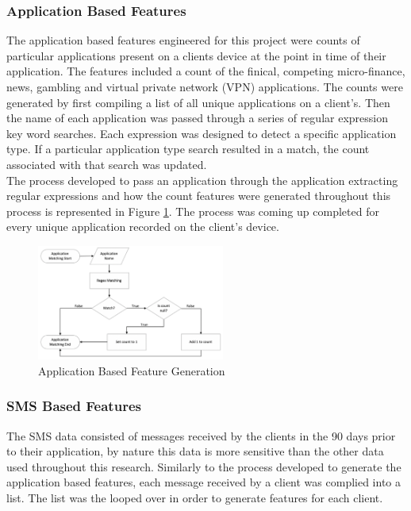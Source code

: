 \subsubsection{Application Based Features}

The application based features engineered for this project were counts of particular applications present on a clients device at the point in time of their application. The features included a count of the finical, competing micro-finance, news, gambling and virtual private network (VPN) applications. The counts were generated by first compiling a list of all unique applications on a client's. Then the name of each application was passed through a series of regular expression key word searches. Each expression was designed to detect a specific application type. If  a particular application type search resulted in a match, the count associated with that search was updated. \\

The process developed to pass an application through the application extracting regular expressions and how the count features were generated throughout this process is represented in Figure \ref{fig:app_features}. The process was coming up completed for every unique application recorded on the client's device. 


\vspace{10 pt}

\begin{figure}[!htb]
\centering
\includegraphics[width=0.55\textwidth]{images/app_feats.png}
\caption{Application Based Feature Generation}
\label{fig:app_features}
\end{figure}


\subsubsection{SMS Based Features}

The SMS data consisted of messages received by the clients in the 90 days prior to their application, by nature this data is more sensitive than the other data used throughout this research. Similarly to the process developed to generate the application based features, each message received by a client was complied into a list. The list was the looped over in order to generate features for each client. \\

